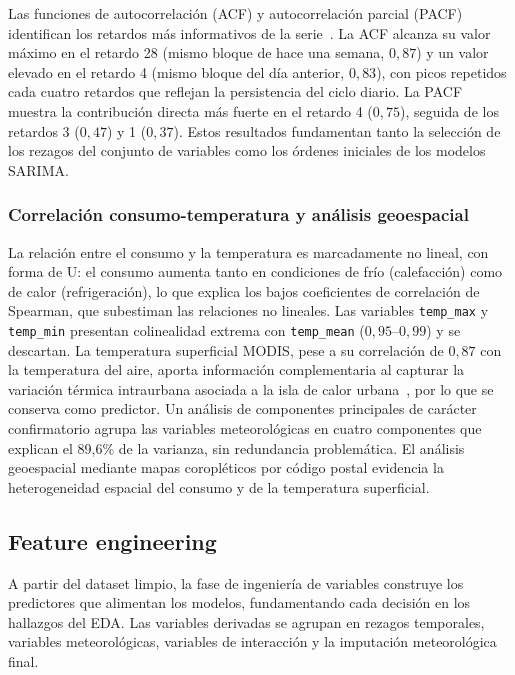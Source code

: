 \documentclass[12pt, a4paper]{article}
\begin{document}
Las funciones de autocorrelación (ACF) y autocorrelación parcial (PACF) identifican los retardos más informativos de la serie~\cite{hyndman2021, boxjenkins2015}. La ACF alcanza su valor máximo en el retardo 28 (mismo bloque de hace una semana, $0,87$) y un valor elevado en el retardo 4 (mismo bloque del día anterior, $0,83$), con picos repetidos cada cuatro retardos que reflejan la persistencia del ciclo diario. La PACF muestra la contribución directa más fuerte en el retardo 4 ($0,75$), seguida de los retardos 3 ($0,47$) y 1 ($0,37$). Estos resultados fundamentan tanto la selección de los rezagos del conjunto de variables como los órdenes iniciales de los modelos SARIMA.

\subsubsection{Correlación consumo-temperatura y análisis geoespacial}


La relación entre el consumo y la temperatura es marcadamente no lineal, con forma de U: el consumo aumenta tanto en condiciones de frío (calefacción) como de calor (refrigeración), lo que explica los bajos coeficientes de correlación de Spearman, que subestiman las relaciones no lineales. Las variables \texttt{temp\_max} y \texttt{temp\_min} presentan colinealidad extrema con \texttt{temp\_mean} ($0,95$--$0,99$) y se descartan. La temperatura superficial MODIS, pese a su correlación de $0,87$ con la temperatura del aire, aporta información complementaria al capturar la variación térmica intraurbana asociada a la isla de calor urbana~\cite{salvati2017}, por lo que se conserva como predictor. Un análisis de componentes principales de carácter confirmatorio agrupa las variables meteorológicas en cuatro componentes que explican el 89,6\% de la varianza, sin redundancia problemática. El análisis geoespacial mediante mapas coropléticos por código postal evidencia la heterogeneidad espacial del consumo y de la temperatura superficial.

\subsection{Feature engineering}


A partir del dataset limpio, la fase de ingeniería de variables construye los predictores que alimentan los modelos, fundamentando cada decisión en los hallazgos del EDA. Las variables derivadas se agrupan en rezagos temporales, variables meteorológicas, variables de interacción y la imputación meteorológica final.
\end{document}
